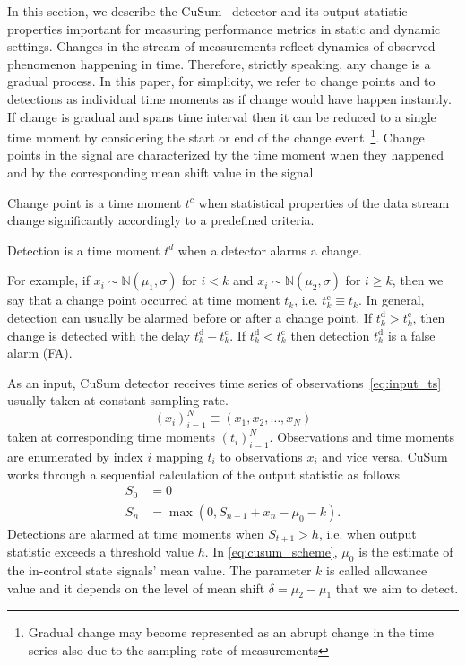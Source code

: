 \documentclass[doctoral,utf8,lot,loar,lof,shortloft,index]{jydiss}
\begin{document}
In this section, we describe the CuSum~\cite{Page1954} detector and its output statistic properties important for measuring performance metrics in static and dynamic settings.
Changes in the stream of measurements reflect dynamics of observed phenomenon happening in time.
Therefore, strictly speaking, any change is a gradual process.
In this paper, for simplicity, we refer to change points and to detections as individual time moments as if change would have happen instantly. If change is gradual and spans time interval then it can be reduced to a single time moment by considering the start or end of the change event~\footnote{Gradual change may become represented as an abrupt change in the time series also due to the sampling rate of measurements}.
Change points in the signal are characterized by the time moment when they happened and by the corresponding mean shift value in the signal.
\begin{definition}
	Change point is a time moment $t^c$ when statistical properties of the data stream change significantly accordingly to a predefined criteria.
\end{definition}
\begin{definition}
	Detection is a time moment $t^d$ when a detector alarms a change.
\end{definition}
For example, if $x_i \sim \mathbb{N}(\mu_1, \sigma)$ for $i < k$ and $x_i \sim \mathbb{N}(\mu_2, \sigma)$ for $i \geq k$,
then we say that a change point occurred at time moment $t_k$, i.e. $t^{\text{c}}_{k} \equiv t_k$.
In general, detection can usually be alarmed before or after a change point.
If $t^{\text{d}}_k > t^{\text{c}}_k$, then change is detected with the delay $t^{\text{d}}_k - t^{\text{c}}_k$.
If $t^{\text{d}}_k < t^{\text{c}}_k$ then detection $t^{\text{d}}_k$ is a false alarm (FA).

As an input, CuSum detector receives time series of observations~\ref{eq:input_ts} usually taken at constant sampling rate.
\begin{equation}\label{eq:input_ts}
	(x_i)_{i=1}^{N} \equiv (x_1, x_2, \dots, x_N)
\end{equation}
taken at corresponding time moments $(t_i)_{i=1}^N$.
Observations and time moments are enumerated by index $i$ mapping $t_i$ to observations $x_i$ and vice versa.
CuSum works through a sequential calculation of the output statistic as follows
\begin{align}
	S_0 &= 0 \nonumber \\
	S_{n} &= \max (0, S_{n-1} + x_n - \mu_0 - k )\label{eq:cusum_scheme}.
\end{align}
Detections are alarmed at time moments when $S_{t+1} > h$, i.e. when output statistic exceeds a threshold value $h$.
In \eqref{eq:cusum_scheme}, $\mu_0$ is the estimate of the in-control state signals' mean value.
The parameter $k$ is called allowance value and it depends on the level of mean shift $\delta=\mu_2-\mu_1$ that we aim to detect.
\end{document}
